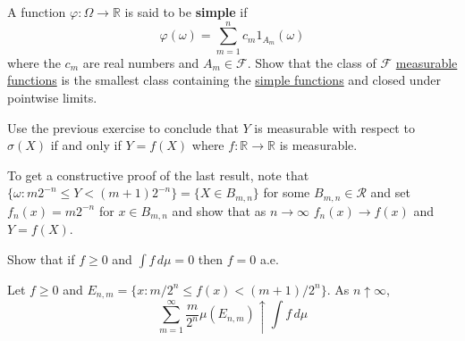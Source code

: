   \begin{exercise}[Durrett 1.3.7]
    A function $\varphi : \Omega \to \mathbb{R}$ is said to be \textbf{simple} if
    \begin{equation*}
      \varphi(\omega) = \sum_{m=1}^{n} c_m 1_{A_m}(\omega)
    \end{equation*}
    where the $c_m$ are real numbers and $A_m \in \mathcal{F}$. Show that the class of $\mathcal{F}$ \hyperref[mt-def:measurable-function]{measurable functions} is the smallest class containing the \hyperref[mt-def:simple-functions]{simple functions} and closed under pointwise limits.
  \end{exercise}
  \begin{solution}

  \end{solution}

  \begin{exercise}[Durrett 1.3.8]
    Use the previous exercise to conclude that $Y$ is measurable with respect to $\sigma(X)$ if and only if $Y = f(X)$ where $f : \mathbb{R} \to \mathbb{R}$ is measurable.
  \end{exercise}
  \begin{solution}

  \end{solution}

  \begin{exercise}[Durrett 1.3.9]
    To get a constructive proof of the last result, note that $\{\omega : m 2^{-n} \leq Y < (m + 1)2^{-n}\} = \{X \in B_{m,n}\}$ for some $B_{m,n} \in \mathcal{R}$ and set $f_n(x) = m 2^{-n}$ for $x \in B_{m,n}$ and show that as $n \to \infty$ $f_n(x) \to f(x)$ and $Y = f(X)$.
  \end{exercise}
  \begin{solution}

  \end{solution}

  \begin{exercise}[Durrett 1.4.1]
    Show that if $f \geq 0$ and $\int f \, d\mu = 0$ then $f = 0$ a.e.
  \end{exercise}
  \begin{solution}

  \end{solution}

  \begin{exercise}[Durrett 1.4.2]
    Let $f \geq 0$ and $E_{n,m} = \{x : m/2^n \leq f(x) < (m + 1)/2^n\}$. As $n \uparrow \infty$,
    \begin{equation*}
      \sum_{m=1}^{\infty} \frac{m}{2^n} \mu(E_{n,m}) \uparrow \int f \, d\mu
    \end{equation*}
  \end{exercise}
  \begin{solution}

  \end{solution}

